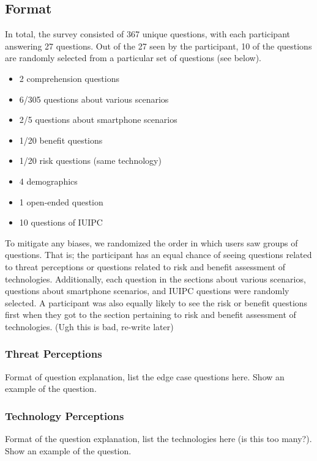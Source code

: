 \documentclass{acm_proc_article-sp}
\begin{document}
\subsection{Format}
In total, the survey consisted of 367 unique questions, with each participant answering 27 questions. Out of the 27 seen by the participant, 10 of the questions are randomly selected from a particular set of questions (see below).   \\[-.8cm]

\begin{itemize} \itemsep1pt \parskip0pt 
\item 2 comprehension questions 
\item 6/305 questions about various scenarios 
\item 2/5 questions about smartphone scenarios 
\item 1/20 benefit questions 
\item 1/20 risk questions (same technology) 
\item 4 demographics
\item 1 open-ended question 
\item 10 questions of IUIPC \\[-.8cm]
\end{itemize}

To mitigate any biases, we randomized the order in which users saw groups of questions. That is; the participant has an equal chance of seeing questions related to threat perceptions or questions related to risk and benefit assessment of technologies. Additionally, each question in the sections about various scenarios, questions about smartphone scenarios, and IUIPC questions were randomly selected. A participant was also equally likely to see the risk or benefit questions first when they got to the section pertaining to risk and benefit assessment of technologies. (Ugh this is bad, re-write later)

\subsubsection{Threat Perceptions}
Format of question explanation, list the edge case questions here. Show an example of the question. 

\subsubsection{Technology Perceptions}
Format of the question explanation, list the technologies here (is this too many?). Show an example of the question. 
\end{document}
